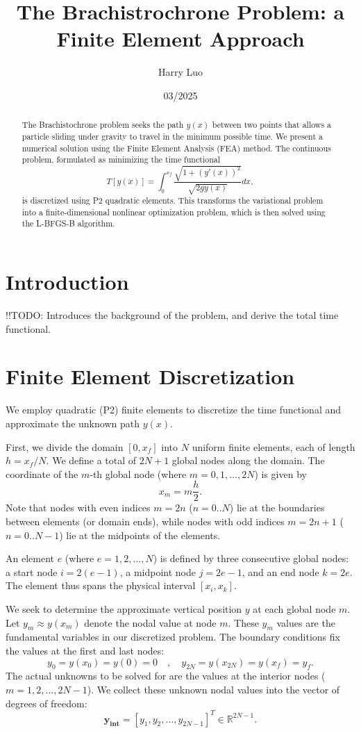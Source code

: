 \documentclass[12pt]{article}
\title{The Brachistrochrone Problem: a Finite Element Approach}
\author{Harry Luo}
\date{03/2025}
\begin{document}
\maketitle
\begin{abstract}
    The Brachistochrone problem seeks the path \(y(x)\) between two points that allows a particle sliding under gravity to travel in the minimum possible time. We present a numerical solution using the Finite Element Analysis (FEA) method. The continuous problem, formulated as minimizing the time functional \[ T[y(x)] = \int_0^{x_f} \frac{\sqrt{1 + (y'(x))^2}}{\sqrt{2gy(x)}} dx, \] is discretized using P2 quadratic elements. This transforms the variational problem into a finite-dimensional nonlinear optimization problem, which is then solved using the L-BFGS-B algorithm.
\end{abstract}


\section{Introduction}
!!TODO: Introduces the background of the problem, and derive the total time functional. 


\section{Finite Element Discretization}
    
    We employ quadratic (P2) finite elements to discretize the time functional and approximate the unknown path \(y(x)\).
    
    First, we divide the domain \( \left[0, x_f\right] \) into \(N \) uniform finite elements, each of length \( h = x_f / N \). We define a total of \(2N+1\) global nodes along the domain. The coordinate of the \(m\)-th global node (where \(m = 0, 1, \ldots, 2N\)) is given by
    \[ x_m = m \frac{h}{2}. \]
    Note that nodes with even indices \(m=2n\) ($n=0..N$) lie at the boundaries between elements (or domain ends), while nodes with odd indices \(m=2n+1\) ($n=0..N-1$) lie at the midpoints of the elements.
    
    An element \(e\) (where \(e = 1, 2, \ldots, N\)) is defined by three consecutive global nodes: a start node \(i = 2(e-1)\), a midpoint node \(j = 2e-1\), and an end node \(k = 2e\). The element thus spans the physical interval \( [x_i, x_k] \).
    
    We seek to determine the approximate vertical position \( y \) at each global node \(m\). Let \( y_m \approx y(x_m) \) denote the nodal value at node \(m\). These \( y_m \) values are the fundamental variables in our discretized problem. The boundary conditions fix the values at the first and last nodes:
    \[ y_{0} = y(x_{0}) = y(0) = 0 \quad , \quad y_{2N} = y(x_{2N}) = y(x_f) = y_f. \]
    The actual unknowns to be solved for are the values at the interior nodes ($m = 1, 2, \ldots, 2N-1$). We collect these unknown nodal values into the vector of degrees of freedom:
    \[ \mathbf{y_\text{int}} = \left[ y_1, y_2, \ldots, y_{2N-1} \right]^T \in \mathbb{R}^{2N-1}. \]
    
\end{document}
